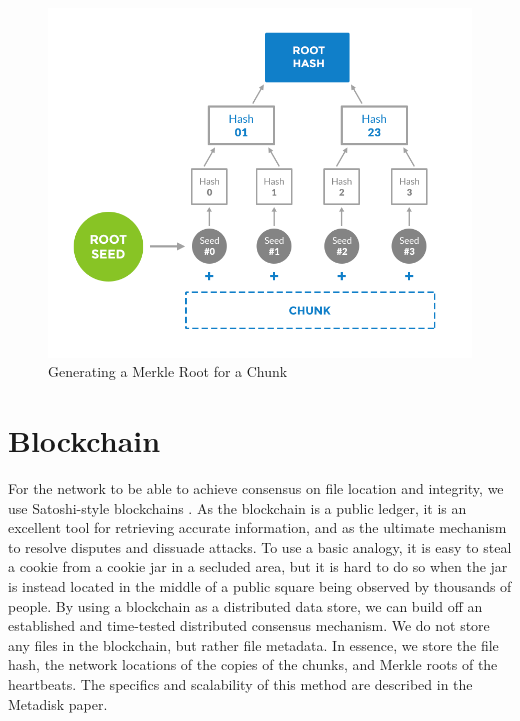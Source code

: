 \documentclass[a4paper,10pt]{article}
\begin{document}
\begin{figure}[h!]
\centering
\includegraphics[width=\linewidth]{2}
\caption{Generating a Merkle Root for a Chunk}
\end{figure}


\section{Blockchain}
For the network to be able to achieve consensus on file location and integrity, we use Satoshi-style blockchains \cite{3}. As the blockchain is a public ledger, it is an excellent tool for retrieving accurate information, and as the ultimate mechanism to resolve disputes and dissuade attacks. To use a basic analogy, it is easy to steal a cookie from a cookie jar in a secluded area, but it is hard to do so when the jar is instead located in the middle of a public square being observed by thousands of people. By using a blockchain as a distributed data store, we can build off an established and time-tested distributed consensus mechanism. We do not store any files in the blockchain, but rather file metadata. In essence, we store the file hash, the network locations of the copies of the chunks, and Merkle roots of the heartbeats. The specifics and scalability of this method are described in the Metadisk \cite{1} paper.  \\
\end{document}
